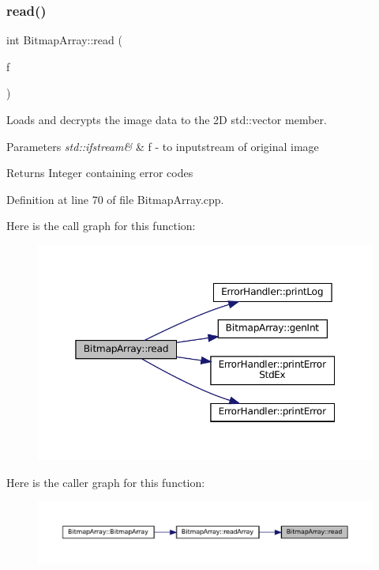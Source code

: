 \subsubsection{\texorpdfstring{read()}{read()}}
{\footnotesize\ttfamily int Bitmap\+Array\+::read (\begin{DoxyParamCaption}\item[{std\+::ifstream \&}]{f }\end{DoxyParamCaption})\hspace{0.3cm}{\ttfamily [private]}}



Loads and decrypts the image data to the 2D std\+::vector member. 


\begin{DoxyParams}{Parameters}
{\em std\+::ifstream\&} & f -\/ to inputstream of original image \\
\hline
\end{DoxyParams}
\begin{DoxyReturn}{Returns}
Integer containing error codes 
\end{DoxyReturn}


Definition at line 70 of file Bitmap\+Array.\+cpp.

Here is the call graph for this function\+:\nopagebreak
\begin{figure}[H]
\begin{center}
\leavevmode
\includegraphics[width=350pt]{classBitmapArray_a3a5834d03cd095769b422d4d66b9435f_cgraph}
\end{center}
\end{figure}
Here is the caller graph for this function\+:\nopagebreak
\begin{figure}[H]
\begin{center}
\leavevmode
\includegraphics[width=350pt]{classBitmapArray_a3a5834d03cd095769b422d4d66b9435f_icgraph}
\end{center}
\end{figure}
\mbox{\label{classBitmapArray_a4ce4b5acc896040075be63a559799e7e}} 
